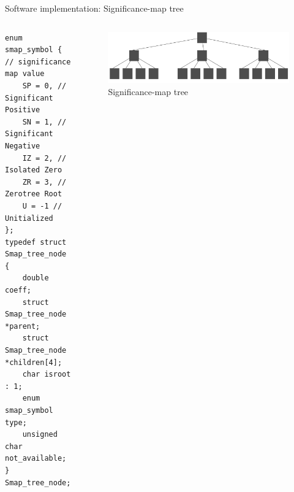 \documentclass{beamer}
\begin{document}
\begin{frame}[fragile]{Software implementation: Significance-map tree}
    \begin{columns}
        \begin{column}{0.6\textwidth}
            \begin{verbatim}
enum smap_symbol { // significance map value
    SP = 0, // Significant Positive
    SN = 1, // Significant Negative
    IZ = 2, // Isolated Zero
    ZR = 3, // Zerotree Root
    U = -1 // Unitialized
};
typedef struct Smap_tree_node {
    double coeff;
    struct Smap_tree_node *parent;
    struct Smap_tree_node *children[4];
    char isroot : 1;
    enum smap_symbol type;
    unsigned char not_available;
} Smap_tree_node;
            \end{verbatim}
        \end{column}
        \begin{column}{0.4\textwidth}
            \begin{figure}[H]
                \centering
                \includegraphics[scale=0.25]{smap.pdf}
                \caption{Significance-map tree}
            \end{figure}
        \end{column}
    \end{columns}
\end{frame}
\end{document}
